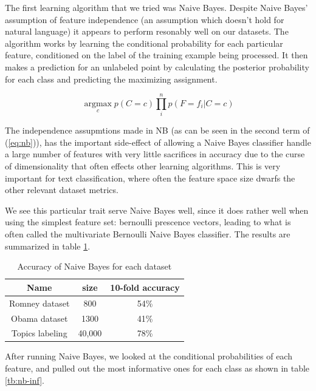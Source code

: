 \documentclass[fontsize=10pt,twocolumn,letterpaper,abstracton]{scrartcl}
\begin{document}
The first learning algorithm that we tried was Naive Bayes.  Despite Naive Bayes' assumption of feature independence (an assumption which doesn't hold for natural language) it appears to perform resonably well on our datasets. The algorithm works by learning the conditional probability for each particular feature, conditioned on the label of the training example being processed. It then makes a prediction for an unlabeled point by calculating the posterior probability for each class and predicting the maximizing assignment.

\begin{equation} \label{eq:nb}
\underset{c}{\operatorname{argmax}} p(C=c) \prod_i^n p(F=f_i | C=c)
\end{equation}

The independence assupmtions made in NB (as can be seen in the second term of (\ref{eq:nb})), has the important side-effect of allowing a Naive Bayes classifier handle a large number of features with very little sacrifices in accuracy due to the curse of dimensionality that often effects other learning algorithms. This is very important for text classification, where often the feature space size dwarfs the other relevant dataset metrics.  

We see this particular trait serve Naive Bayes well, since it does rather well when using the simplest feature set: bernoulli prescence vectors, leading to what is often called the multivariate Bernoulli Naive Bayes classifier. The results are summarized in table \ref{tb:nb-accuracy}.

\begin{table}[H]
\centering
\begin{tabular}{ c c c }
Name & size & 10-fold accuracy \\
\hline
Romney dataset & 800 & 54\% \\
Obama dataset & 1300 &  41\% \\
Topics labeling & 40,000 & 78\% \\
\end{tabular}
\caption{Accuracy of Naive Bayes for each dataset}
\label{tb:nb-accuracy}
\end{table}

After running Naive Bayes, we looked at the conditional probabilities of each feature, and pulled out the most informative ones for each class as shown in table \ref{tb:nb-inf}.
\end{document}
